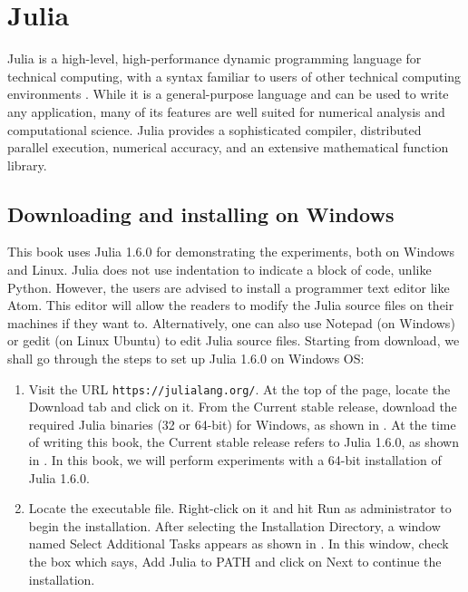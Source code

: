 
\section{Julia} \label{sec:julia-start}
Julia is a high-level, high-performance dynamic programming language for
technical computing, with a syntax familiar to users of other technical computing
environments \cite{julia-ref}. While it is a general-purpose language and can be used to write any
application, many of its features are well suited for numerical analysis and
computational science. Julia provides a sophisticated compiler, distributed
parallel execution, numerical accuracy, and an extensive mathematical function
library.


\subsection{Downloading and installing on Windows} \label{julia-install-windows}
This book uses Julia 1.6.0 for demonstrating the experiments, both on Windows and Linux.
Julia does not use indentation to indicate a block of code, unlike Python. However,
the users are advised to install a programmer text editor like Atom. This editor will
allow the readers to modify the Julia source files on their machines if they want to.
Alternatively, one can also use Notepad (on Windows) or gedit (on Linux Ubuntu) to edit
Julia source files. Starting from download, we shall go through the steps to set
up Julia 1.6.0 on Windows OS:
\begin{enumerate}
      \item Visit the URL {\tt https://julialang.org/}.  At the top of the page,
            locate the Download tab and click on it. From the Current stable release,
            download the required Julia binaries (32 or 64-bit) for Windows, as shown in .
            At the time of writing this book, the Current stable release refers to Julia 1.6.0, as shown in . In this book, we will perform
            experiments with a 64-bit installation of Julia 1.6.0.
      \item Locate the executable file. Right-click on it and hit
            Run as administrator to begin the installation. After selecting the Installation Directory,
            a window named Select Additional Tasks appears as shown in .
            In this window, check the box which says, Add Julia to PATH and click on Next to continue the installation.
\end{enumerate}

